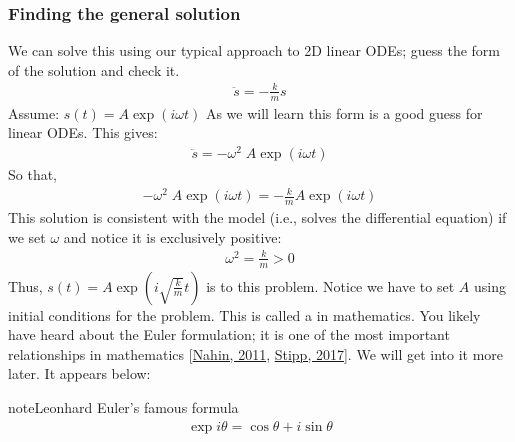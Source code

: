 \documentclass[letterpaper,10pt,english]{jupyterBook}
\begin{document}
\subsubsection{Finding the general solution}
\label{\detokenize{content/1_modeling/SHO-intro:finding-the-general-solution}}
\sphinxAtStartPar
We can solve this using our typical approach to 2D linear ODEs; guess the form of the solution and check it.
\begin{equation*}
\begin{split}\ddot{s} = -\frac{k}{m}s\end{split}
\end{equation*}
\sphinxAtStartPar
Assume: \(s(t) = A\exp(i\omega t)\) As we will learn this form is a good guess for linear ODEs. This gives:
\begin{equation*}
\begin{split}\ddot{s} = -\omega^2\;A\exp(i\omega t)\end{split}
\end{equation*}
\sphinxAtStartPar
So that,
\begin{equation*}
\begin{split}-\omega^2\;A\exp(i\omega t) = -\frac{k}{m}A\exp(i\omega t)\end{split}
\end{equation*}
\sphinxAtStartPar
This solution is consistent with the model (i.e., solves the differential equation) if we set \(\omega\) and notice it is exclusively positive:
\begin{equation*}
\begin{split}\omega^2 = \frac{k}{m} > 0\end{split}
\end{equation*}
\sphinxAtStartPar
Thus, \(s(t) = A\exp(i\sqrt{\frac{k}{m}} t)\) is  to this problem. Notice we have to set \(A\) using initial conditions for the problem. This is called a  in mathematics. You likely have heard about the Euler formulation; it is one of the most important relationships in mathematics {[}\hyperlink{cite.content/1_modeling/SHO-intro:id2}{Nahin, 2011}, \hyperlink{cite.content/1_modeling/SHO-intro:id3}{Stipp, 2017}{]}. We will get into it more later. It appears below:

\begin{sphinxadmonition}{note}{Leonhard Euler’s famous formula}
\begin{equation*}
\begin{split}\exp{i\theta} = \cos{\theta} + i \sin{\theta}\end{split}
\end{equation*}\end{sphinxadmonition}
\end{document}
